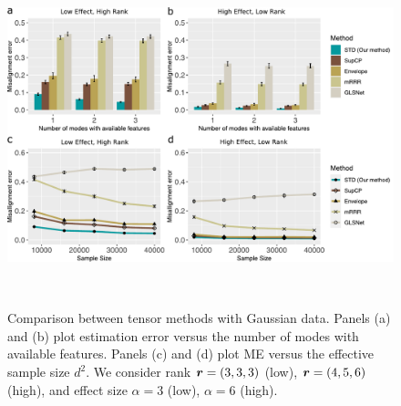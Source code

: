 \documentclass[12pt]{article}
\theoremstyle{definition}
\theoremstyle{definition}
\begin{document}
\begin{figure}[t]
\centering
\includegraphics[width=12cm]{comp_final_normal.pdf} 
\caption{Comparison between tensor methods with Gaussian data. Panels (a) and (b) plot estimation error versus the number of modes with available features. Panels (c) and (d) plot ME versus the effective sample size $d^2$.
We consider rank $\bm{r}=(3,3,3)$ (low), $\bm{r}=(4,5,6)$ (high), and effect size $\alpha =3 $ (low), $\alpha=6$ (high).}~\label{fig:comp}
\vspace{-.5cm}
\end{figure}
\end{document}
